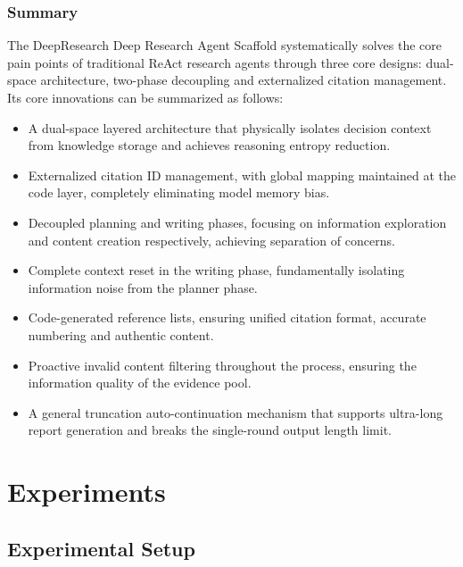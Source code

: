 \documentclass{huawei}
\begin{document}
\subsubsection{Summary}
The DeepResearch Deep Research Agent Scaffold systematically solves the core pain points of traditional ReAct research agents through three core designs: dual-space architecture, two-phase decoupling and externalized citation management. Its core innovations can be summarized as follows:
\begin{itemize}[leftmargin=1em, listparindent=\parindent]
\item A dual-space layered architecture that physically isolates decision context from knowledge storage and achieves reasoning entropy reduction.
\item Externalized citation ID management, with global mapping maintained at the code layer, completely eliminating model memory bias.
\item Decoupled planning and writing phases, focusing on information exploration and content creation respectively, achieving separation of concerns.
\item Complete context reset in the writing phase, fundamentally isolating information noise from the planner phase.
\item Code-generated reference lists, ensuring unified citation format, accurate numbering and authentic content.
\item Proactive invalid content filtering throughout the process, ensuring the information quality of the evidence pool.
\item A general truncation auto-continuation mechanism that supports ultra-long report generation and breaks the single-round output length limit.
\end{itemize}
\fi


\section{Experiments}
\subsection{Experimental Setup}
\end{document}
